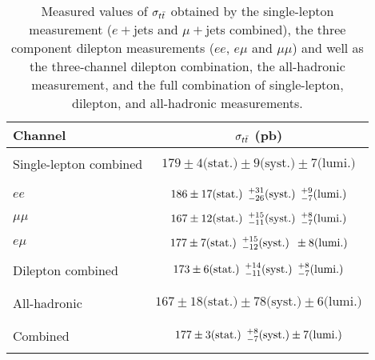 

\begin{table}[htdp]
  \begin{center}
    \begin{tabular}{|l|c|}\hline
      Channel & $\sigma_{\ttbar}$ (pb) \\ 
      \hline
      & \\
      Single-lepton combined & $179 \pm  4  \textrm{(stat.)} \pm 9           \textrm{(syst.)}  \pm 7 \textrm{(lumi.)}$ \\
      & \\
      \hline
      & \\
      $ee$      & $186 \pm 17  \textrm{(stat.)} \sp {}^{+31}_{-26} \textrm{(syst.)} \sp {}^{+9}_{-7} \textrm{(lumi.)}$ \\ 
      & \\
      $\mu\mu$  & $167 \pm 12 \textrm{(stat.)}  \sp {}^{+15}_{-11} \textrm{(syst.)} \sp {}^{+8}_{-7} \textrm{(lumi.)}$ \\ 
      & \\
      $e\mu$    & $177 \pm 7  \textrm{(stat.)}  \sp {}^{+15}_{-12} \textrm{(syst.)} \sp \pm 8        \textrm{(lumi.)}$ \\ 
      & \\
      Dilepton combined & $173 \pm 6  \textrm{(stat.)}  \sp {}^{+14}_{-11} \textrm{(syst.)} \sp {}^{+8}_{-7} \textrm{(lumi.)}$ \\
      & \\
      \hline
      & \\
      All-hadronic           & $167 \pm  18 \textrm{(stat.)} \pm 78           \textrm{(syst.)} \pm 6 \textrm{(lumi.)}$ \\
      & \\ 
      \hline 
      \hline
      & \\
      Combined   & $177 \pm  3 \textrm{(stat.)}  \sp {}^{+8}_{-7} \textrm{(syst.)} \pm 7 \textrm{(lumi.})$ \\
      & \\ 
      \hline
    \end{tabular}
  \end{center}
  \caption{\label{tab:results}
    Measured values of $\sigma_{\ttbar}$ obtained by the single-lepton measurement ($e+$jets and $\mu+$jets combined), the three component dilepton measurements ($ee$, $e \mu$ and $\mu \mu$) and well as the three-channel dilepton combination, the all-hadronic measurement, and the full combination of single-lepton, dilepton, and all-hadronic measurements.
  }

\end{table}
